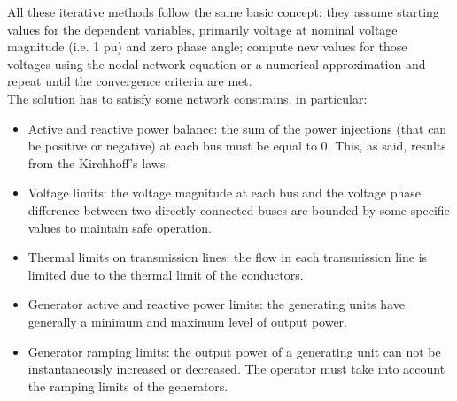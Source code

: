 All these iterative methods follow the same basic concept: they assume starting values for the dependent variables, primarily voltage at nominal voltage magnitude (i.e. 1 \gls{pu}) and zero phase angle; compute new values for those voltages using the nodal network equation or a numerical approximation and repeat until the convergence criteria are met. \\

The solution has to satisfy some network constrains, in particular:
\begin{itemize}
    \item Active and reactive power balance: the sum of the power injections (that can be positive or negative) at each bus must be equal to 0. This, as said, results from the Kirchhoff’s laws.
    
    \item Voltage limits: the voltage magnitude at each bus and the voltage phase difference between two directly connected buses are bounded by some specific values to maintain safe operation.
    
    \item Thermal limits on transmission lines: the flow in each transmission line is limited due to the thermal limit of the conductors.
    
    \item Generator active and reactive power limits: the generating units have    generally a minimum and maximum level of output power.
    
    \item Generator ramping limits: the output power of a generating unit can not be instantaneously increased or decreased. The operator must take into account the ramping limits of the generators.
\end{itemize}


